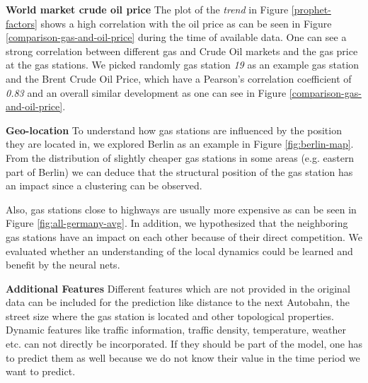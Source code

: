 \documentclass[%
a4paper,
DIV12,
2.5headlines,
bigheadings,
titlepage,
openbib,
]{scrartcl}
\newcommand{\bscom}[2]{%
  \st{#1}{\color{blue}\fontsize{8}{8}\selectfont\,#2}}
\begin{document}



\textbf{World market crude oil price}
The plot of the \textit{trend} in Figure \ref{prophet-factors} shows a high correlation with the oil price as can be seen in Figure \ref{comparison-gas-and-oil-price} during the time of available data.
One can see a strong correlation between different gas and Crude Oil markets and the gas price at the gas stations. 
We picked randomly gas station \textit{19} as an example gas station and the Brent Crude Oil Price, which have a Pearson's correlation coefficient of \textit{0.83} and an overall similar development as one can see in Figure \ref{comparison-gas-and-oil-price}.

\textbf{Geo-location} To understand how gas stations are influenced by the position they are located in, we explored Berlin as an example in Figure \ref{fig:berlin-map}.
From the distribution of slightly cheaper gas stations in some areas (e.g. eastern part of Berlin) we can deduce that the structural position of the gas station has an impact since a clustering can be observed.

Also, gas stations close to highways are usually more expensive as can be seen in Figure \ref{fig:all-germany-avg}.
In addition, we hypothesized
that the neighboring gas stations have an impact on each other because of their direct competition.
We evaluated whether an understanding of the local dynamics could be learned and benefit by the neural nets.

\textbf{Additional Features} 
Different features which are not provided in the original data can be included for the prediction like distance to the next Autobahn, the street size where the gas station is located and other topological properties.
Dynamic features like traffic information, traffic density, temperature, weather etc. can not directly be incorporated.
If they should be part of the model, one has to predict them as well because we do not know their value in the time period we want to predict.
\end{document}
